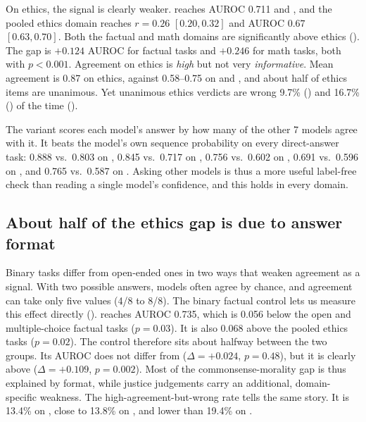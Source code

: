 On ethics, the signal is clearly weaker.
\ethcs reaches AUROC 0.711 and , and the pooled ethics domain reaches $r=0.26$ $[0.20, 0.32]$ and AUROC $0.67$ $[0.63, 0.70]$.
Both the factual and math domains are significantly above ethics ().
The gap is $+0.124$ AUROC for factual tasks and $+0.246$ for math tasks, both with $p<0.001$.
Agreement on ethics is {\em high} but not very {\em informative}.
Mean agreement is 0.87 on ethics, against 0.58--0.75 on \triviaqa and \mmlu, and about half of ethics items are unanimous.
Yet unanimous ethics verdicts are wrong 9.7\% (\ethcs) and 16.7\% (\ethjus) of the time ().

The \loo variant scores each model's answer by how many of the other 7 models agree with it.
It beats the model's own sequence probability on every direct-answer task: 0.888 vs.\ 0.803 on \triviaqa, 0.845 vs.\ 0.717 on \mmlu, 0.756 vs.\ 0.602 on \ethcs, 0.691 vs.\ 0.596 on \ethjus, and 0.765 vs.\ 0.587 on \mmlutf.
Asking other models is thus a more useful label-free check than reading a single model's confidence, and this holds in every domain.

\subsection{About half of the ethics gap is due to answer format}
\label{sec:res_format}



Binary tasks differ from open-ended ones in two ways that weaken agreement as a signal.
With two possible answers, models often agree by chance, and agreement can take only five values (4/8 to 8/8).
The binary factual control \mmlutf lets us measure this effect directly ().
\mmlutf reaches AUROC 0.735, which is 0.056 below the open and multiple-choice factual tasks ($p=0.03$).
It is also 0.068 above the pooled ethics tasks ($p=0.02$).
The control therefore sits about halfway between the two groups.
Its AUROC does not differ from \ethcs ($\Delta=+0.024$, $p=0.48$), but it is clearly above \ethjus ($\Delta=+0.109$, $p=0.002$).
Most of the commonsense-morality gap is thus explained by format, while justice judgements carry an additional, domain-specific weakness.
The high-agreement-but-wrong rate tells the same story.
It is 13.4\% on \mmlutf, close to 13.8\% on \ethcs, and lower than 19.4\% on \ethjus.

